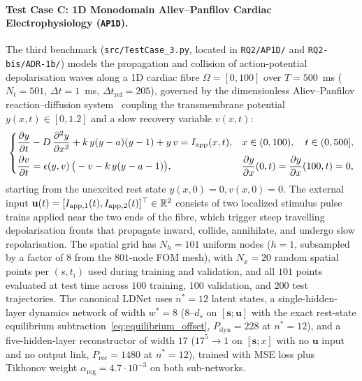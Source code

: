 \paragraph{Test Case C: 1D Monodomain Aliev--Panfilov Cardiac Electrophysiology (\texttt{AP1D}).}
The third benchmark (\texttt{src/TestCase\_3.py}, located in \texttt{RQ2/AP1D/} and \texttt{RQ2-bis/ADR-1b/}) models the propagation and collision of action-potential depolarisation waves along a 1D cardiac fibre $\Omega = [0, 100]$ over $T = 500$~ms ($N_t = 501$, $\Delta t = 1$~ms, $\Delta t_{\mathrm{ref}} = 205$), governed by the dimensionless Aliev--Panfilov reaction--diffusion system~\cite{aliev1996simple} coupling the transmembrane potential $y(x,t) \in [0, 1.2]$ and a slow recovery variable $v(x,t)$:
\begin{equation}
  \begin{dcases}
    \frac{\partial y}{\partial t} - D\,\frac{\partial^2 y}{\partial x^2} + k\,y(y - a)(y - 1) + y\,v = I_{\mathrm{app}}(x,t), & x \in (0, 100), \quad t \in (0, 500], \\
    \frac{\partial v}{\partial t} = \epsilon(y,v)\,\big(-v - k\,y(y - a - 1)\big), & \frac{\partial y}{\partial x}(0,t) = \frac{\partial y}{\partial x}(100,t) = 0,
  \end{dcases}
  \label{eq:caseC_pde}
\end{equation}
starting from the unexcited rest state $y(x,0) = 0, v(x,0) = 0$. The external input $\mathbf{u}(t) = [I_{\mathrm{app},1}(t), I_{\mathrm{app},2}(t)]^\top \in \mathbb{R}^2$ consists of two localized stimulus pulse trains applied near the two ends of the fibre, which trigger steep travelling depolarisation fronts that propagate inward, collide, annihilate, and undergo slow repolarisation. The spatial grid has $N_h = 101$ uniform nodes ($h = 1$, subsampled by a factor of $8$ from the $801$-node FOM mesh), with $N_x = 20$ random spatial points per $(s,t_i)$ used during training and validation, and all $101$ points evaluated at test time across $100$ training, $100$ validation, and $200$ test trajectories. The canonical LDNet uses $n^* = 12$ latent states, a single-hidden-layer dynamics network of width $w^* = 8$ ($8\text{--}d_s$ on $[\mathbf{s};\mathbf{u}]$ with the exact rest-state equilibrium subtraction~\eqref{eq:equilibrium_offset}, $P_{\mathrm{dyn}} = 228$ at $n^*=12$), and a five-hidden-layer reconstructor of width $17$ ($17^5 \to 1$ on $[\mathbf{s}; x]$ with no $\mathbf{u}$ input and no output link, $P_{\mathrm{rec}} = 1480$ at $n^*=12$), trained with MSE loss plus Tikhonov weight $\alpha_{\mathrm{reg}} = 4.7 \cdot 10^{-3}$ on both sub-networks.

